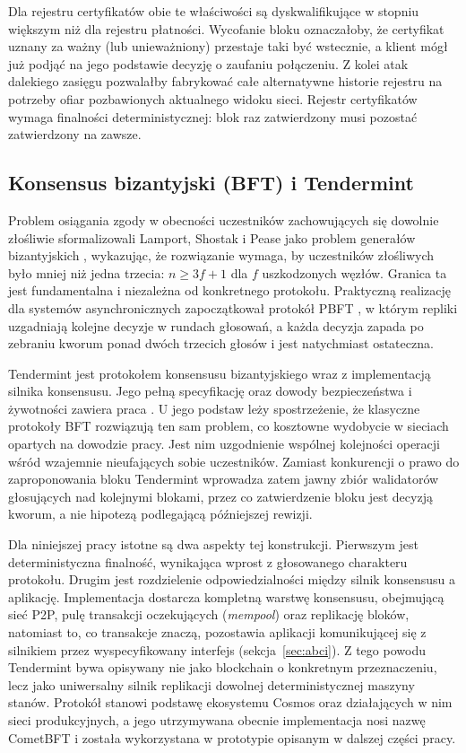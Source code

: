 Dla rejestru certyfikatów obie te właściwości są dyskwalifikujące w stopniu większym niż dla rejestru płatności. Wycofanie bloku oznaczałoby, że certyfikat uznany za ważny (lub unieważniony) przestaje taki być wstecznie, a klient mógł już podjąć na jego podstawie decyzję o zaufaniu połączeniu. Z kolei atak dalekiego zasięgu pozwalałby fabrykować całe alternatywne historie rejestru na potrzeby ofiar pozbawionych aktualnego widoku sieci. Rejestr certyfikatów wymaga finalności deterministycznej: blok raz zatwierdzony musi pozostać zatwierdzony na zawsze.

\subsection{Konsensus bizantyjski (BFT) i Tendermint}
\label{subsec:bft-tendermint}

Problem osiągania zgody w obecności uczestników zachowujących się dowolnie złośliwie sformalizowali Lamport, Shostak i Pease jako problem generałów bizantyjskich \cite{lamport1982byzantine}, wykazując, że rozwiązanie wymaga, by uczestników złośliwych było mniej niż jedna trzecia: $n \geq 3f + 1$ dla $f$ uszkodzonych węzłów. Granica ta jest fundamentalna i niezależna od konkretnego protokołu. Praktyczną realizację dla systemów asynchronicznych zapoczątkował protokół PBFT \cite{castro1999pbft}, w którym repliki uzgadniają kolejne decyzje w rundach głosowań, a każda decyzja zapada po zebraniu kworum ponad dwóch trzecich głosów i jest natychmiast ostateczna.

Tendermint jest protokołem konsensusu bizantyjskiego wraz z implementacją silnika konsensusu. Jego pełną specyfikację oraz dowody bezpieczeństwa i żywotności zawiera praca \cite{buchman2018tendermint}. U jego podstaw leży spostrzeżenie, że klasyczne protokoły BFT rozwiązują ten sam problem, co kosztowne wydobycie w sieciach opartych na dowodzie pracy. Jest nim uzgodnienie wspólnej kolejności operacji wśród wzajemnie nieufających sobie uczestników. Zamiast konkurencji o prawo do zaproponowania bloku Tendermint wprowadza zatem jawny zbiór walidatorów głosujących nad kolejnymi blokami, przez co zatwierdzenie bloku jest decyzją kworum, a nie hipotezą podlegającą późniejszej rewizji.

Dla niniejszej pracy istotne są dwa aspekty tej konstrukcji. Pierwszym jest deterministyczna finalność, wynikająca wprost z głosowanego charakteru protokołu. Drugim jest rozdzielenie odpowiedzialności między silnik konsensusu a aplikację. Implementacja dostarcza kompletną warstwę konsensusu, obejmującą sieć P2P, pulę transakcji oczekujących (\emph{mempool}) oraz replikację bloków, natomiast to, co transakcje znaczą, pozostawia aplikacji komunikującej się z silnikiem przez wyspecyfikowany interfejs (sekcja~\ref{sec:abci}). Z tego powodu Tendermint bywa opisywany nie jako blockchain o konkretnym przeznaczeniu, lecz jako uniwersalny silnik replikacji dowolnej deterministycznej maszyny stanów. Protokół stanowi podstawę ekosystemu Cosmos oraz działających w nim sieci produkcyjnych, a jego utrzymywana obecnie implementacja nosi nazwę CometBFT \cite{cometbft-docs} i została wykorzystana w prototypie opisanym w dalszej części pracy.

